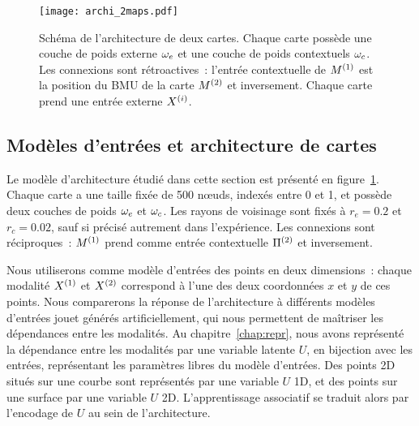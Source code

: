 \documentclass[../main]{subfiles}
\begin{document}
\begin{figure}
	\centering\texttt{[image: archi\_2maps.pdf]}
	\caption{Schéma de l'architecture de deux cartes. Chaque carte possède une couche de poids externe $\omega_e$ et une couche de poids contextuels $\omega_c$. Les connexions sont rétroactives~: l'entrée contextuelle de $M^{({1})}$ est la position du BMU de la carte $M^{({2})}$ et inversement. 
	Chaque carte prend une entrée externe $X^{({i})}$.\label{fig:archis}}
\end{figure}

\subsection{Modèles d'entrées et architecture de cartes}

Le modèle d'architecture étudié dans cette section est présenté en figure~\ref{fig:archis}.
Chaque carte a une taille fixée de 500 n\oe{}uds, indexés entre 0 et 1, et possède deux couches de poids $\omega_e$ et $\omega_c$. Les rayons de voisinage sont fixés à $r_e = 0.2$ et $r_c = 0.02$, sauf si précisé autrement dans l'expérience. Les connexions sont réciproques~: $M^{({1})}$ prend comme entrée contextuelle $\Pi^{({2})}$ et inversement.

Nous utiliserons comme modèle d'entrées des points en deux dimensions~: chaque modalité $X^{({1})}$ et $X^{({2})}$ correspond à l'une des deux coordonnées $x$ et $y$ de ces points. Nous comparerons la réponse de l'architecture à différents modèles d'entrées jouet générés artificiellement, qui nous permettent de maîtriser les dépendances entre les modalités.
Au chapitre~\ref{chap:repr}, nous avons représenté la dépendance entre les modalités par une variable latente $U$, en bijection avec les entrées, représentant les paramètres libres du modèle d'entrées. 
Des points 2D situés sur une courbe sont représentés par une variable $U$ 1D, et des points sur une surface par une variable $U$ 2D. L'apprentissage associatif se traduit alors par l'encodage de $U$ au sein de l'architecture.
\end{document}
